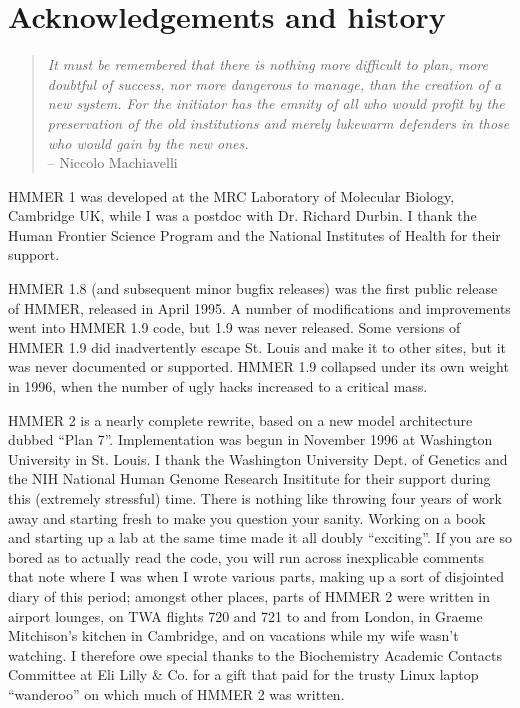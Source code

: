 \chapter {Acknowledgements and history}

\begin{quote}
\textit{
It must be remembered that there is nothing more difficult to plan, more
doubtful of success, nor more dangerous to manage, than the creation of
a new system.  For the initiator has the emnity of all who would profit
by the preservation of the old institutions and merely lukewarm defenders
in those who would gain by the new ones.\\}
\hspace*{\fill} -- Niccolo Machiavelli
\end{quote}

HMMER 1 was developed at the MRC Laboratory of Molecular Biology,
Cambridge UK, while I was a postdoc with Dr. Richard Durbin. I thank
the Human Frontier Science Program and the National Institutes of
Health for their support. 

HMMER 1.8 (and subsequent minor bugfix releases) was the first public
release of HMMER, released in April 1995. A number of modifications
and improvements went into HMMER 1.9 code, but 1.9 was never
released. Some versions of HMMER 1.9 did inadvertently escape
St. Louis and make it to other sites, but it was never documented or
supported. HMMER 1.9 collapsed under its own weight in 1996, when the
number of ugly hacks increased to a critical mass.

HMMER 2 is a nearly complete rewrite, based on a new model
architecture dubbed ``Plan 7''. Implementation was begun in November
1996 at Washington University in St. Louis. I thank the Washington
University Dept. of Genetics and the NIH National Human Genome
Research Insititute for their support during this (extremely
stressful) time. There is nothing like throwing four years of work
away and starting fresh to make you question your sanity. Working on a
book \cite{Durbin98} and starting up a lab at the same time made it
all doubly ``exciting''. If you are so bored as to actually read the
code, you will run across inexplicable comments that note where I was
when I wrote various parts, making up a sort of disjointed diary of
this period; amongst other places, parts of HMMER 2 were written in
airport lounges, on TWA flights 720 and 721 to and from London, in
Graeme Mitchison's kitchen in Cambridge, and on vacations while my
wife wasn't watching. I therefore owe special thanks to the
Biochemistry Academic Contacts Committee at Eli Lilly \& Co. for a
gift that paid for the trusty Linux laptop ``wanderoo'' on which much
of HMMER 2 was written.


